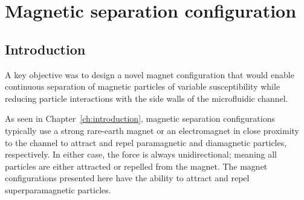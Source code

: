 \chapter{Magnetic separation configuration}\label{ch:magneticSeparationConfiguration}

\section{Introduction}\label{sec:introduction}
A key objective was to design a novel magnet configuration that would enable continuous separation of magnetic particles of variable susceptibility while reducing particle interactions with the side walls of the microfluidic channel. 

As seen in Chapter~\ref{ch:introduction}, magnetic separation configurations typically use a strong rare-earth magnet or an electromagnet in close proximity to the channel to attract and repel paramagnetic and diamagnetic particles, respectively. In either case, the force is always unidirectional; meaning all particles are either attracted or repelled from the magnet. The magnet configurations presented here have the ability to attract and repel superparamagnetic particles.

